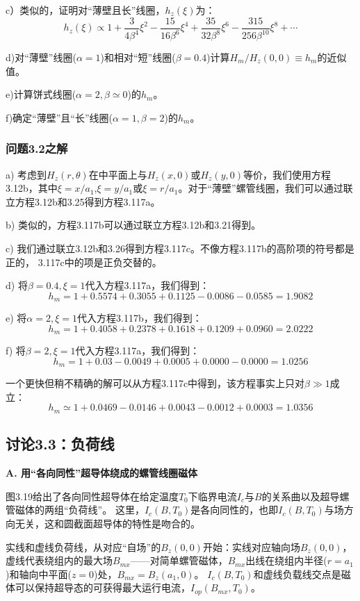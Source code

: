 c）类似的，证明对“薄壁且长”线圈，$h_z(\xi)$为：
\begin{equation}
h_z(\xi)\propto1+\frac{3}{4\beta^4}\xi^2-\frac{15}{16\beta^6}\xi^4+\frac{35}{32\beta^8}\xi^6-\frac{315}{256\beta^{10}}\xi^8+\cdots%
\end{equation}

d)对“薄壁”线圈($\alpha=1$)和相对“短”线圈($\beta=0.4$)计算$H_m/H_z(0, 0)\equiv h_m$的近似值。

e)计算饼式线圈($\alpha=2,\beta\simeq 0$)的$h_m$。

f)确定“薄壁”且“长”线圈($\alpha=1,\beta=2$)的$h_m$。 

\subsubsection{问题3.2之解}
a) 考虑到$H_z(r,\theta)$在中平面上与$H_z(x, 0)$或$H_z(y, 0)$等价，我们使用方程3.12b，其中$\xi = x/a_1$,$\xi = y/a_1$或$\xi = r/a_1$。对于“薄壁”螺管线圈，我们可以通过联立方程3.12b和3.25得到方程3.117a。

b) 类似的，方程3.117b可以通过联立方程3.12b和3.21得到。

c) 我们通过联立3.12b和3.26得到方程3.117c。不像方程3.117b的高阶项的符号都是正的，
3.117c中的项是正负交替的。 

d) 将$\beta=0.4,\xi=1$代入方程3.117a，我们得到：
$$h_m=1 + 0.5574 + 0.3055 + 0.1125 − 0.0086 − 0.0585 = 1.9082$$

e) 将$\alpha=2,\xi=1$代入方程3.117b，我们得到：
$$ h_m=1 + 0.4058 + 0.2378 + 0.1618 + 0.1209 + 0.0960 = 2.0222$$

f) 将$\beta=2,\xi=1$代入方程3.117a，我们得到：
$$ h_m=1 + 0.03 − 0.0049 + 0.0005 + 0.0000 − 0.0000 = 1.0256 $$

一个更快但稍不精确的解可以从方程3.117c中得到，该方程事实上只对$\beta\gg 1$成立：
$$h_m \simeq 1 + 0.0469 − 0.0146 + 0.0043 − 0.0012 + 0.0003 = 1.0356$$

\newpage

\subsection{讨论3.3：负荷线}
\textbf{A. 用“各向同性”超导体绕成的螺管线圈磁体}

图3.19给出了各向同性超导体在给定温度$T_0$下临界电流$I_c$与$B$的关系曲以及超导螺管磁体的两组“负荷线”。
这里，$I_c(B,T_0)$是各向同性的，也即$I_c(B,T_0)$与场方向无关，这和圆截面超导体的特性是吻合的。

实线和虚线负荷线，从对应“自场”的$B_z(0,0)$开始：实线对应轴向场$B_z(0,0)$，虚线代表绕组内的最大场$B_{mx}$——对简单螺管磁体，$B_{mx}$出线在绕组内半径($r=a_1$)和轴向中平面($z=0$)处，$B_{mx}=B_z(a_1,0)$。
$I_c(B,T_0)$和虚线负载线交点是磁体可以保持超导态的可获得最大运行电流，$I_{op}(B_{mx},T_0)$。

